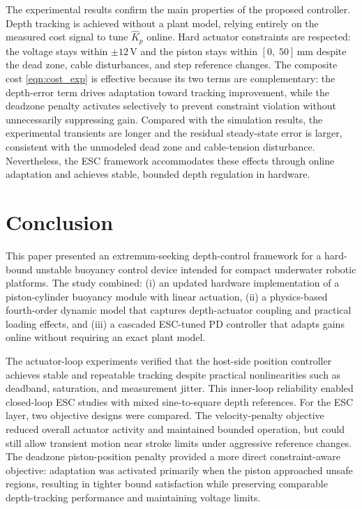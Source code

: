 ﻿\documentclass[subscriptcorrection,upint,varvw,barcolor=Goldenrod3,mathalfa=cal=euler,balance,hyphenate,french,pdf-a]{asmejour}
\begin{document}
The experimental results confirm the main properties of the proposed controller. Depth tracking is achieved without a plant model, relying entirely on the measured cost signal to tune $\hat{K}_p$ online. Hard actuator constraints are respected: the voltage stays within $\pm 12$\,V and the piston stays within $[0,\;50]$\,mm despite the dead zone, cable disturbances, and step reference changes. The composite cost \eqref{eqn:cost_exp} is effective because its two terms are complementary: the depth-error term drives adaptation toward tracking improvement, while the deadzone penalty activates selectively to prevent constraint violation without unnecessarily suppressing gain. Compared with the simulation results, the experimental transients are longer and the residual steady-state error is larger, consistent with the unmodeled dead zone and cable-tension disturbance. Nevertheless, the ESC framework accommodates these effects through online adaptation and achieves stable, bounded depth regulation in hardware.

\section{Conclusion}

This paper presented an extremum-seeking depth-control framework for a hard-bound unstable buoyancy control device intended for compact underwater robotic platforms. The study combined: (i) an updated hardware implementation of a piston-cylinder buoyancy module with linear actuation, (ii) a physics-based fourth-order dynamic model that captures depth-actuator coupling and practical loading effects, and (iii) a cascaded ESC-tuned PD controller that adapts gains online without requiring an exact plant model.

The actuator-loop experiments verified that the host-side position controller achieves stable and repeatable tracking despite practical nonlinearities such as deadband, saturation, and measurement jitter. This inner-loop reliability enabled closed-loop ESC studies with mixed sine-to-square depth references. For the ESC layer, two objective designs were compared. The velocity-penalty objective reduced overall actuator activity and maintained bounded operation, but could still allow transient motion near stroke limits under aggressive reference changes. The deadzone piston-position penalty provided a more direct constraint-aware objective: adaptation was activated primarily when the piston approached unsafe regions, resulting in tighter bound satisfaction while preserving comparable depth-tracking performance and maintaining voltage limits.
\end{document}
